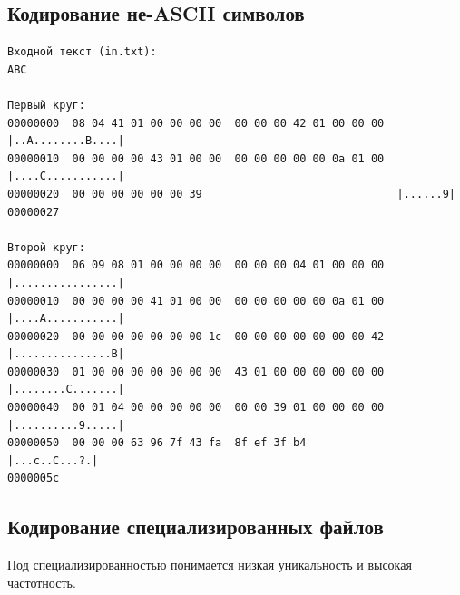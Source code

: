 \documentclass[12pt, a4paper]{article}
\begin{document}
\subsection{Кодирование не-ASCII символов}
\begin{verbatim}
Входной текст (in.txt):
ABC

Первый круг:
00000000  08 04 41 01 00 00 00 00  00 00 00 42 01 00 00 00  |..A........B....|
00000010  00 00 00 00 43 01 00 00  00 00 00 00 00 0a 01 00  |....C...........|
00000020  00 00 00 00 00 00 39                              |......9|
00000027

Второй круг:
00000000  06 09 08 01 00 00 00 00  00 00 00 04 01 00 00 00  |................|
00000010  00 00 00 00 41 01 00 00  00 00 00 00 00 0a 01 00  |....A...........|
00000020  00 00 00 00 00 00 00 1c  00 00 00 00 00 00 00 42  |...............B|
00000030  01 00 00 00 00 00 00 00  43 01 00 00 00 00 00 00  |........C.......|
00000040  00 01 04 00 00 00 00 00  00 00 39 01 00 00 00 00  |..........9.....|
00000050  00 00 00 63 96 7f 43 fa  8f ef 3f b4              |...c..C...?.|
0000005c
\end{verbatim}

\subsection{Кодирование специализированных файлов}
Под специализированностью понимается низкая уникальность и высокая частотность.
\end{document}
